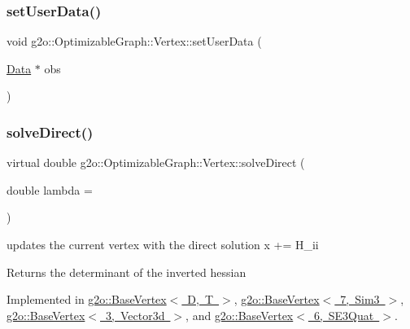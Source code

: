 \subsubsection{\texorpdfstring{set\+User\+Data()}{setUserData()}}
{\footnotesize\ttfamily void g2o\+::\+Optimizable\+Graph\+::\+Vertex\+::set\+User\+Data (\begin{DoxyParamCaption}\item[{\mbox{\hyperlink{classg2o_1_1_optimizable_graph_1_1_data}{Data}} $\ast$}]{obs }\end{DoxyParamCaption})\hspace{0.3cm}{\ttfamily [inline]}}

\mbox{\label{classg2o_1_1_optimizable_graph_1_1_vertex_a61c4e7b7a7a61e1f287069a8cb01004f}} 
\subsubsection{\texorpdfstring{solve\+Direct()}{solveDirect()}}
{\footnotesize\ttfamily virtual double g2o\+::\+Optimizable\+Graph\+::\+Vertex\+::solve\+Direct (\begin{DoxyParamCaption}\item[{double}]{lambda = {} }\end{DoxyParamCaption})\hspace{0.3cm}{\ttfamily [pure virtual]}}

updates the current vertex with the direct solution x += H\+\_\+ii \begin{DoxyReturn}{Returns}
the determinant of the inverted hessian 
\end{DoxyReturn}


Implemented in \mbox{\hyperlink{classg2o_1_1_base_vertex_a0bbd9551b7e03f7e422169e396e8ec9b}{g2o\+::\+Base\+Vertex$<$ D, T $>$}}, \mbox{\hyperlink{classg2o_1_1_base_vertex_a0bbd9551b7e03f7e422169e396e8ec9b}{g2o\+::\+Base\+Vertex$<$ 7, Sim3 $>$}}, \mbox{\hyperlink{classg2o_1_1_base_vertex_a0bbd9551b7e03f7e422169e396e8ec9b}{g2o\+::\+Base\+Vertex$<$ 3, Vector3d $>$}}, and \mbox{\hyperlink{classg2o_1_1_base_vertex_a0bbd9551b7e03f7e422169e396e8ec9b}{g2o\+::\+Base\+Vertex$<$ 6, S\+E3\+Quat $>$}}.

\mbox{\label{classg2o_1_1_optimizable_graph_1_1_vertex_a0a4ecc894d008d9c3806a3660e7dfe6f}} 
